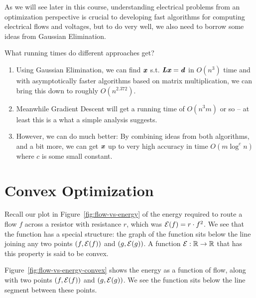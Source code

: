 As we will see later in this course, understanding electrical problems
from an optimization perspective is crucial to developing fast
algorithms for computing electrical flows and voltages, but to do very
well, we also need to borrow some ideas from Gaussian Elimination.

What running times do different approaches get?
\begin{enumerate}
\item Using Gaussian Elimination, we can find $\boldsymbol{\mathit{x}}$ s.t. $\boldsymbol{\mathit{L}} \boldsymbol{\mathit{x}} =
  \boldsymbol{\mathit{d}}$ in $O(n^3)$ time and with asymptotically faster algorithms based on matrix
  multiplication, we can bring this down to roughly $O(n^{2.372})$.
\item Meanwhile Gradient Descent will get a running time of $O(n^3m)$
  or so -- at least this is a what a simple analysis suggests.
\item However, we can do much better: By combining ideas from both
  algorithms, and a bit more,
  we can get $\boldsymbol{\mathit{x}}$ up to very high
  accuracy in time $O(m \log^c n)$ where $c$ is some small constant.
\end{enumerate}


\section{Convex Optimization}

Recall our plot in Figure~\ref{fig:flow-vs-energy} of the energy required to
route a flow $f$ across a resistor with resistance $r$, which was
$\mathcal{E}(f) = r\cdot f^2$.
%
We see that the function has a special structure: the graph of the function sits
below the line joining any two points $(f, \mathcal{E}(f))$ and $(g,\mathcal{E}(g))$.
A function $\mathcal{E} : \mathbb{R} \to \mathbb{R}$ that has this property is said to be convex.

Figure~\ref{fig:flow-vs-energy-convex} shows the energy as a function of flow, along with two
points $(f, \mathcal{E}(f))$ and $(g,\mathcal{E}(g))$. We see the function sits below the
line segment between these points.

